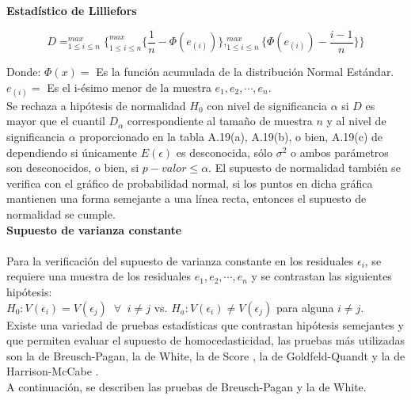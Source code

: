 \textbf{Estadístico de Lilliefors}

\begin{center}
	$$D = ^{max}_{1\leq i \leq n}\lbrace ^{max}_{1\leq i \leq n} \lbrace \frac{1}{n} - \Phi (e_{(i)}) \rbrace , ^{max}_{1 \leq i \leq n} \lbrace \Phi (e_{(i)}) - \frac{i-1}{n} \rbrace   \rbrace$$
\end{center}



Donde:
$\Phi (x) =$  Es la función acumulada de la distribución Normal Estándar.\\
$e_{(i)} =$ Es el i-ésimo menor de la muestra $e_1, e_2, \cdots , e_n$.\\

Se rechaza a hipótesis de normalidad $H_0$ con nivel de significancia $\alpha$ si $D$ es mayor que el cuantil $D_\alpha$ correspondiente al tamaño de muestra $n$ y al nivel de significancia $\alpha$ proporcionado en la tabla A.19(a), A.19(b), o bien, A.19(c) de \textcite{daniel-1990} dependiendo si únicamente $E(\epsilon)$ es desconocida, sólo $\sigma ^2$ o ambos parámetros son desconocidos, o bien, si $p-valor \leq \alpha$. El supuesto de normalidad también se verifica con el gráfico de probabilidad normal, si los puntos en dicha gráfica mantienen una forma semejante a una línea recta, entonces el supuesto de normalidad se cumple.\\



\textbf{Supuesto de varianza constante}\\\\
Para la verificación del supuesto de varianza constante en los residuales $\epsilon_i$, se requiere una muestra de los residuales $e_1, e_2, \cdots , e_n$ y se contrastan las siguientes hipótesis:\\

$H_0: V(\epsilon_i) = V(\epsilon_j) \;\; \forall \;\; i \neq j$   vs.   $H_a: V(\epsilon_i) \neq V(\epsilon_j)$ para alguna $i \neq j$. \\

Existe una variedad de pruebas estadísticas que contrastan hipótesis semejantes y que permiten evaluar el supuesto de homocedasticidad, las pruebas más utilizadas son la de Breusch-Pagan, la de White, la de Score \parencite{taboga-2017}, la de Goldfeld-Quandt \parencite{goldfeld-2024} y la de Harrison-McCabe \parencite{harris-1979} .\\

A continuación, se describen las pruebas de Breusch-Pagan y la de White.\\




